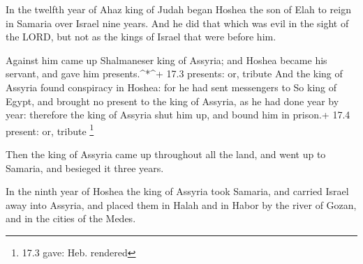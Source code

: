  In the twelfth year of Ahaz king of Judah began Hoshea the
son of Elah to reign in Samaria over Israel nine years.  And
he did that which was evil in the sight of the LORD, but not as the
kings of Israel that were before him.

 Against him came up Shalmaneser king of Assyria; and Hoshea
became his servant, and gave him presents.\^{}*\^{}+ 17.3 presents: or,
tribute  And the king of Assyria found conspiracy in Hoshea:
for he had sent messengers to So king of Egypt, and brought no present
to the king of Assyria, as he had done year by year: therefore the king
of Assyria shut him up, and bound him in prison.+ 17.4 present: or,
tribute \footnote{17.3 gave: Heb. rendered}

 Then the king of Assyria came up throughout all the land,
and went up to Samaria, and besieged it three years.

 In the ninth year of Hoshea the king of Assyria took
Samaria, and carried Israel away into Assyria, and placed them in Halah
and in Habor by the river of Gozan, and in the cities of the Medes.


